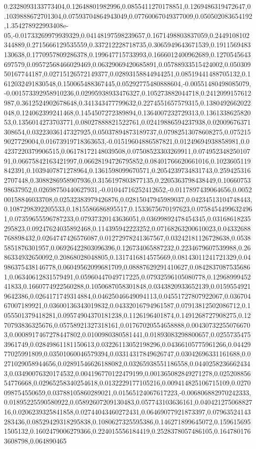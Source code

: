 0.2328093133773404,0.12648801982996,0.0855411270178851,0.1269486319472647,0.1039888672701304,0.07593704864943049,0.07760067049377009,0.050502083654192,1.354278922993408e-05,-0.01733269979939329,0.04148197598239657,0.1671498803837059,0.2449108102344889,0.2715666129535559,0.337212228718735,0.3065949643671539,0.1911569483130638,0.1770957809286378,0.199647715733993,0.1666012400962689,0.1270545643697579,0.09572568466029469,0.06329069420685891,0.05788933515424002,0.05030950167744187,0.02715126572149377,0.02893158844944251,0.08519441488705132,0.1612032491830548,0.150065488367445,0.05292775480888604,-0.00551480498085079,-0.001573392958910236,0.02995938933476327,0.105273882044718,0.2412099157612987,0.3612524902678648,0.341343477799632,0.2274551657579315,0.1380492662022048,0.124062399241468,0.1454507272389894,0.1364007232729313,0.136133862582053,0.1356014273703771,0.08027888821522761,0.02419886594237938,0.02009676371308654,0.03223036147327925,0.05037894873189737,0.07982513078608275,0.0752159027729004,0.01673919718363653,-0.01519604886587821,0.01249694938858981,0.04237220379906515,0.06178172148039508,0.07508523303269911,0.07495234825010791,0.06675842163421997,0.06628194726795852,0.08401766620661016,0.1023605119842391,0.1039407871278964,0.1361598099670571,0.2054239734831743,0.2594253162707448,0.3088286958907936,0.3156197803877135,0.2205363798438449,0.1066075398637952,0.02698750440627931,-0.01044716252412652,-0.0117897439064656,0.005200158846033708,0.02532383979426876,0.02815047945989037,0.04234513104748443,0.1087298392205533,0.1815586686895517,0.1533675670197623,0.07584544996324961,0.07359655596787233,0.07937320143636051,0.03699892478454345,0.03168618235295823,0.09247624035892468,0.114395942223252,0.07168263200610023,0.04332688768898432,0.0264747426576087,0.01272978241367567,0.03242181126728638,0.05385851876301957,0.06926422803096396,0.126734065887232,0.2234679607539988,0.2686334932650092,0.20868028048805,0.1317416814575669,0.08143011241721329,0.04986375438146778,0.06049562099681709,0.08887629291410627,0.08428370875356861,0.06340612831579491,0.05960447049717225,0.07932596105080778,0.1296899945241833,0.1660774922560288,0.1050687058301848,0.0343820933652139,0.01595549219642386,0.0264171749314884,0.04625046649094113,0.04551727807922067,0.03670467007189921,0.03600136343019832,0.04332016794961587,0.07913812502086712,0.1055501379418281,0.09574904370181238,0.1126196401874,0.1491268727908275,0.1270793836325676,0.05758921327318161,0.01767020554658888,0.004307322550766703,0.0008917467278447802,0.0100980380581441,0.01893083298800657,0.02557354753961749,0.02849861181150613,0.03226113052198296,0.04366105775961266,0.0442977025991809,0.03501060046579394,0.03314317849626747,0.03042696331161688,0.0271029058944656,0.02891546626188082,0.03265938551186558,0.04402582366624343,0.03490076320174532,0.004196770122479199,0.001365082849271278,0.02520885654776668,0.02965258340254618,0.0132229177105216,0.009414825106715109,0.0270098754550659,0.03788105860289021,0.01565124067617223,-0.006806882970242333,0.01895225590580922,0.05892607209130483,0.057743103636161,0.04042127506882716,0.0206239325841858,0.02744043460272431,0.06469077921873397,0.07963524143283436,0.08529429318295838,0.1080627325595386,0.146271899645072,0.1596156951505132,0.1602479006279366,0.224015556184419,0.2528378057486105,0.1647801763608798,0.064890465